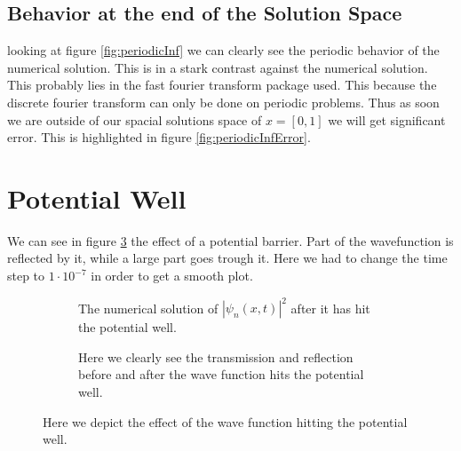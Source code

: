 \documentclass[11pt]{article}
\newlength\figureheight
\newlength\figurewidth
\newif\iftikz
\begin{document}
\subsection{Behavior at the end of the Solution Space}
looking at figure \ref{fig:periodicInf} we can clearly see the periodic behavior of the numerical solution. This is in a stark contrast against the numerical solution. This probably lies in the fast fourier transform package used. This because the discrete fourier transform can only be done on periodic problems. Thus as soon we are outside of our spacial solutions space of $x=[0,1]$ we will get significant error. This is highlighted in figure \ref{fig:periodicInfError}.
\iftikz
\begin{figure}[H]
	\centering
	\begin{subfigure}{.9\linewidth}
		\setlength\figureheight{.5\linewidth} 
		\setlength\figurewidth{.9\linewidth}
		
		\caption{The numerical solution ($\psi_n$) plotted against the analytical solution ($\psi_a$).}
		\label{fig:periodicInfPlot}
	\end{subfigure}
	\begin{subfigure}{.9\linewidth}
		\setlength\figureheight{.5\linewidth} 
		\setlength\figurewidth{.9\linewidth}
		
		\caption{The error is defined as the difference between the analytical solution and numerical solution.}
		\label{fig:periodicInfError}
	\end{subfigure}
	\label{fig:smallError}
	\caption{The numerical and analytical solution as it passes its solution space of $x=[0,1]$. One can clearly see in figure \ref{fig:periodicInfPlot} that the numerical solution is periodic. The error caused by this is highlighted in figure \ref{fig:periodicInfError}}
\end{figure}
\fi
\section{Potential Well}
We can see in figure \ref{fig:potWell} the effect of a potential barrier. Part of the wavefunction is reflected by it, while a large part goes trough it. Here we had to change the time step to $1\cdot10^{-7}$ in order to get a smooth plot. 
\begin{figure}[H]
	\centering
	\begin{subfigure}{.9\linewidth}
		\setlength{} 
		\setlength{}
		
		\caption{The numerical solution of $|\psi_n(x,t)|^2$ after it has hit the potential well.}
		\label{fig:potWellfPlot}
	\end{subfigure}
	\begin{subfigure}{.9\linewidth}
		\setlength{} 
		\setlength{}
		
		\caption{Here we clearly see the transmission and reflection before and after the wave function hits the potential well.}
		\label{fig:potWellTR}
	\end{subfigure}
	\label{fig:potWell}
	\caption{Here we depict the effect of the wave function hitting the potential well.}
\end{figure}
\fi
\end{document}
